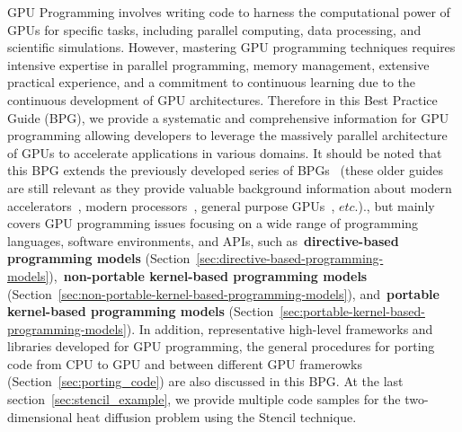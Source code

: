 \par
GPU Programming involves writing code to harness the computational power of GPUs for specific tasks, including parallel computing, data processing, and scientific simulations.
However, mastering GPU programming techniques requires intensive expertise in parallel programming, memory management, extensive practical experience, and a commitment to continuous learning due to the continuous development of GPU architectures.
Therefore in this Best Practice Guide (BPG), we provide a systematic and comprehensive information for GPU programming allowing developers to leverage the massively parallel architecture of GPUs to accelerate applications in various domains.
It should be noted that this BPG extends the previously developed series of BPGs~\cite{prace-bpg} (these older guides are still relevant as they provide valuable background information about modern accelerators~\cite{modern-accelerators}, modern processors~\cite{modern-processors}, general purpose GPUs~\cite{gpgpu}, $etc.$)., but mainly covers GPU programming issues focusing on a wide range of programming languages, software environments, and APIs, such as~\textbf{directive-based programming models} (Section~\ref{sec:directive-based-programming-models}),~\textbf{non-portable kernel-based programming models} (Section~\ref{sec:non-portable-kernel-based-programming-models}), and~\textbf{portable kernel-based programming models} (Section~\ref{sec:portable-kernel-based-programming-models}).
In addition, representative high-level frameworks and libraries developed for GPU programming, the general procedures for porting code from CPU to GPU and between different GPU framerowks (Section~\ref{sec:porting_code}) are also discussed in this BPG.
At the last section~\ref{sec:stencil_example}, we provide multiple code samples for the two-dimensional heat diffusion problem using the Stencil technique. 
